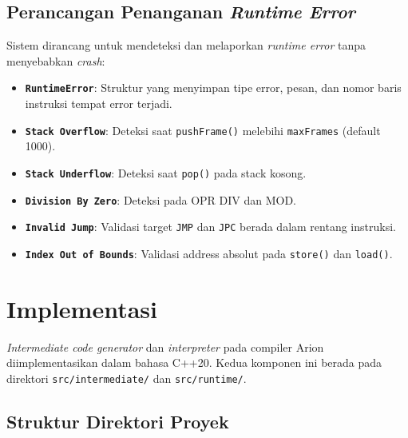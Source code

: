 \documentclass[12pt,a4paper]{article}
\begin{document}
\subsection{Perancangan Penanganan \textit{Runtime Error}}

Sistem dirancang untuk mendeteksi dan melaporkan \textit{runtime error} tanpa
menyebabkan \textit{crash}:

\begin{itemize}
    \item \textbf{\texttt{RuntimeError}}: Struktur yang menyimpan tipe error,
        pesan, dan nomor baris instruksi tempat error terjadi.
    \item \textbf{\texttt{Stack Overflow}}: Deteksi saat \texttt{pushFrame()}
        melebihi \texttt{maxFrames} (default 1000).
    \item \textbf{\texttt{Stack Underflow}}: Deteksi saat \texttt{pop()} pada
        stack kosong.
    \item \textbf{\texttt{Division By Zero}}: Deteksi pada OPR DIV dan MOD.
    \item \textbf{\texttt{Invalid Jump}}: Validasi target \texttt{JMP} dan
        \texttt{JPC} berada dalam rentang instruksi.
    \item \textbf{\texttt{Index Out of Bounds}}: Validasi address absolut
        pada \texttt{store()} dan \texttt{load()}.
\end{itemize}



\section{Implementasi}

\textit{Intermediate code generator} dan \textit{interpreter} pada compiler
Arion diimplementasikan dalam bahasa C++20. Kedua komponen ini berada pada
direktori \texttt{src/intermediate/} dan \texttt{src/runtime/}.

\subsection{Struktur Direktori Proyek}
\end{document}
